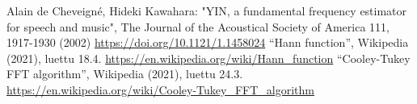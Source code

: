 \documentclass[11pt,oneside,a4paper]{memoir}
\begin{document}
\begin{thebibliography}{1}
 Alain de Cheveigné, Hideki Kawahara: "YIN, a fundamental frequency estimator for speech and music", The Journal of the Acoustical Society of America 111, 1917-1930 (2002) \url{https://doi.org/10.1121/1.1458024}
 ``Hann function'', Wikipedia (2021), luettu 18.4. \url{https://en.wikipedia.org/wiki/Hann_function}
 ``Cooley-Tukey FFT algorithm'', Wikipedia (2021), luettu 24.3. \url{https://en.wikipedia.org/wiki/Cooley-Tukey_FFT_algorithm}
\end{thebibliography}
\end{document}
